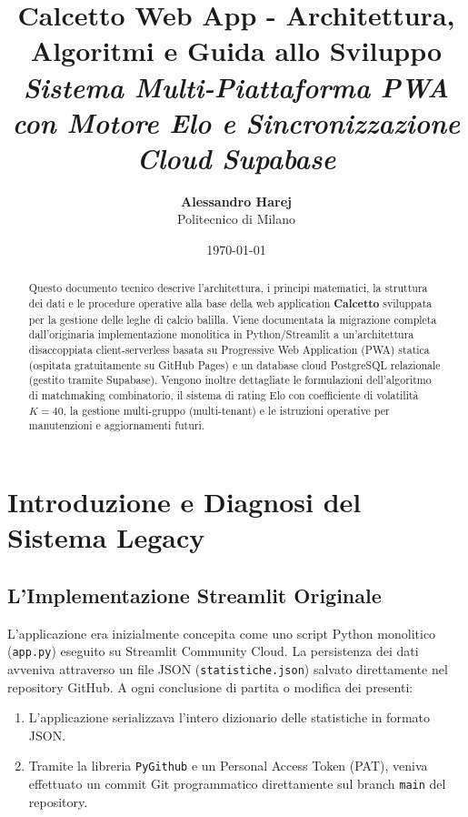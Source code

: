 \documentclass[11pt,a4paper]{article}
\title{\Huge \textbf{Calcetto Web App - Architettura, Algoritmi e Guida allo Sviluppo}\\
\Large \textit{Sistema Multi-Piattaforma PWA con Motore Elo e Sincronizzazione Cloud Supabase}}
\author{\textbf{Alessandro Harej} \\ Politecnico di Milano}
\date{\today}
\begin{document}
\maketitle

\begin{abstract}
Questo documento tecnico descrive l'architettura, i principi matematici, la struttura dei dati e le procedure operative alla base della web application \textbf{Calcetto} sviluppata per la gestione delle leghe di calcio balilla. Viene documentata la migrazione completa dall'originaria implementazione monolitica in Python/Streamlit a un'architettura disaccoppiata client-serverless basata su Progressive Web Application (PWA) statica (ospitata gratuitamente su GitHub Pages) e un database cloud PostgreSQL relazionale (gestito tramite Supabase). Vengono inoltre dettagliate le formulazioni dell'algoritmo di matchmaking combinatorio, il sistema di rating Elo con coefficiente di volatilit\`a $K=40$, la gestione multi-gruppo (multi-tenant) e le istruzioni operative per manutenzioni e aggiornamenti futuri.
\end{abstract}

\tableofcontents
\newpage

\section{Introduzione e Diagnosi del Sistema Legacy}

\subsection{L'Implementazione Streamlit Originale}
L'applicazione era inizialmente concepita come uno script Python monolitico (\texttt{app.py}) eseguito su Streamlit Community Cloud. La persistenza dei dati avveniva attraverso un file JSON (\texttt{statistiche.json}) salvato direttamente nel repository GitHub. A ogni conclusione di partita o modifica dei presenti:
\begin{enumerate}
    \item L'applicazione serializzava l'intero dizionario delle statistiche in formato JSON.
    \item Tramite la libreria \texttt{PyGithub} e un Personal Access Token (PAT), veniva effettuato un commit Git programmatico direttamente sul branch \texttt{main} del repository.
\end{enumerate}
\end{document}
